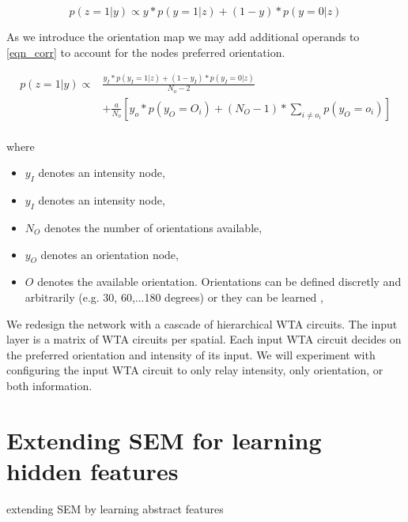 \documentclass{report}%
\begin{document}
\begin{equation}
	p(z=1|y) \propto y*p(y=1|z) + (1-y)*p(y=0|z)
	\label{eqn_corr}
\end{equation}

As we introduce the orientation map we may add additional operands to \ref{eqn_corr} to account for the nodes preferred orientation.

\begin{equation}
	\begin{split}
		p(z=1|y) \propto &\frac{y_I*p(y_I=1|z) + (1-y_I)*p(y_I=0|z)}{N_o-2} \\
			&+ \frac{a}{N_o}[y_o*p(y_O=O_i)+(N_O-1)*\sum_{i\neq o_i}p(y_O=o_i)]\\
	\end{split}
	\label{eqn_corr2}
\end{equation}

where
\begin{itemize}
  \item $y_I$ denotes an intensity node,
  \item $y_I$ denotes an intensity node,
  \item $N_O$ denotes the number of orientations available,
  \item $y_O$ denotes an orientation node,
  \item $O$ denotes the available orientation. Orientations can be defined discretly and arbitrarily (e.g. 30, 60,...180 degrees) or they can be learned \cite{Nessler2010},
\end{itemize}

We redesign the network with a cascade of hierarchical WTA circuits. The input layer is a matrix of WTA circuits per spatial. Each input WTA circuit decides on the preferred orientation and intensity of its input. We will experiment with configuring the input WTA circuit to only relay intensity, only orientation, or both information. 

\section{Extending SEM for learning hidden features}

extending SEM by learning abstract features
\end{document}
